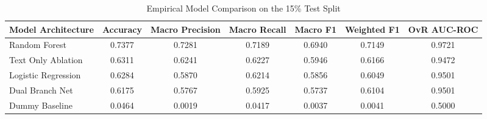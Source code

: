 \begin{table}
\caption{Empirical Model Comparison on the 15\% Test Split}
\label{tab:model_comparison}
\begin{tabular}{lcccccc}
\toprule
Model Architecture & Accuracy & Macro Precision & Macro Recall & Macro F1 & Weighted F1 & OvR AUC-ROC \\
\midrule
Random Forest & 0.7377 & 0.7281 & 0.7189 & 0.6940 & 0.7149 & 0.9721 \\
Text Only Ablation & 0.6311 & 0.6241 & 0.6227 & 0.5946 & 0.6166 & 0.9472 \\
Logistic Regression & 0.6284 & 0.5870 & 0.6214 & 0.5856 & 0.6049 & 0.9501 \\
Dual Branch Net & 0.6175 & 0.5767 & 0.5925 & 0.5737 & 0.6104 & 0.9501 \\
Dummy Baseline & 0.0464 & 0.0019 & 0.0417 & 0.0037 & 0.0041 & 0.5000 \\
\bottomrule
\end{tabular}
\end{table}
